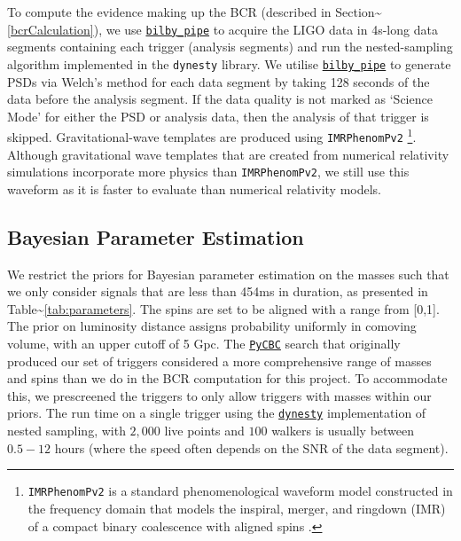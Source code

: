 \documentclass[%
 reprint,
 amsmath,amssymb,
 aps,
]{revtex4-2}
\begin{document}
To compute the evidence making up the BCR (described in Section\textasciitilde\ref{bcrCalculation}), we use \href{https://lscsoft.docs.ligo.org/bilby_pipe/}{\texttt{bilby\_pipe}} to acquire
the LIGO data in 4s-long data segments containing each trigger (analysis segments) and run the nested-sampling algorithm
implemented in the \texttt{dynesty} library. We utilise \href{https://lscsoft.docs.ligo.org/bilby_pipe/}{\texttt{bilby\_pipe}} to generate PSDs via Welch's method for each data
segment by taking 128 seconds of the data before the analysis segment. If the data quality is not marked as `Science
Mode' for either the PSD or analysis data, then the analysis of that trigger is skipped. Gravitational-wave templates
are produced using \texttt{IMRPhenomPv2} \footnote{\texttt{IMRPhenomPv2} is a standard phenomenological waveform model constructed in the
  frequency domain that models the inspiral, merger, and ringdown (IMR) of a compact binary coalescence with aligned spins
  \citep{khan2016frequency}.}. Although gravitational wave templates that are created from numerical relativity simulations
incorporate more physics than \texttt{IMRPhenomPv2}, we still use this waveform as it is faster to evaluate than numerical
relativity models.

\hypertarget{bayesian-parameter-estimation}{%
\subsection{Bayesian Parameter Estimation}\label{bayesian-parameter-estimation}}

We restrict the priors for Bayesian parameter estimation on the masses such that we only consider signals that are less
than 454ms in duration, as presented in Table\textasciitilde\ref{tab:parameters}. The spins are set to be aligned with a range from
{[}0,1{]}. The prior on luminosity distance assigns probability uniformly in comoving volume, with an upper cutoff of 5 Gpc.
The \href{https://pycbc.org/}{\texttt{PyCBC}} search that originally produced our set of triggers considered a more comprehensive range of masses and
spins than we do in the BCR computation for this project. To accommodate this, we prescreened the triggers to only allow
triggers with masses within our priors. The run time on a single trigger using the \href{https://arxiv.org/abs/1904.02180}{\texttt{dynesty}} implementation of nested
sampling, with \(2,000\) live points and \(100\) walkers is usually between \(0.5-12\) hours (where the speed often depends on
the SNR of the data segment).
\end{document}
